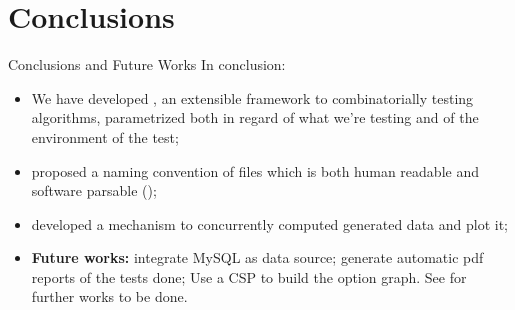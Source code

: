 \section*{Conclusions}

\begin{frame}{Conclusions and Future Works}
    In conclusion:
    \begin{itemize}
        \item We have developed , an extensible framework to combinatorially testing algorithms, parametrized both in regard of what we're testing and of the environment of the test;
        \item proposed a naming convention of files which is both human readable and software parsable ();
        \item developed a mechanism to concurrently computed generated data and plot it;
        \item \textbf{Future works:} integrate MySQL as data source; generate automatic pdf reports of the tests done; Use a CSP to build the option graph. See  for further works to be done.
    \end{itemize}
\end{frame}